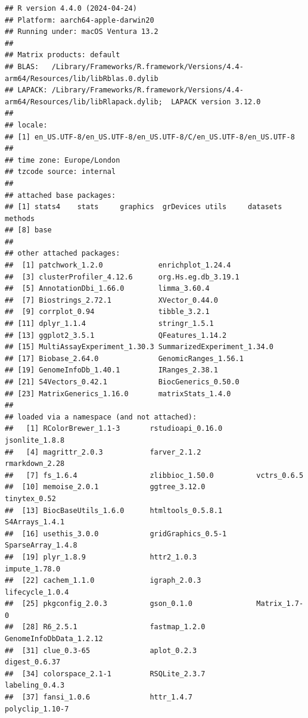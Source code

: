\documentclass[9pt,a4paper,]{extarticle}
\begin{document}
\begin{verbatim}
## R version 4.4.0 (2024-04-24)
## Platform: aarch64-apple-darwin20
## Running under: macOS Ventura 13.2
## 
## Matrix products: default
## BLAS:   /Library/Frameworks/R.framework/Versions/4.4-arm64/Resources/lib/libRblas.0.dylib 
## LAPACK: /Library/Frameworks/R.framework/Versions/4.4-arm64/Resources/lib/libRlapack.dylib;  LAPACK version 3.12.0
## 
## locale:
## [1] en_US.UTF-8/en_US.UTF-8/en_US.UTF-8/C/en_US.UTF-8/en_US.UTF-8
## 
## time zone: Europe/London
## tzcode source: internal
## 
## attached base packages:
## [1] stats4    stats     graphics  grDevices utils     datasets  methods  
## [8] base     
## 
## other attached packages:
##  [1] patchwork_1.2.0             enrichplot_1.24.4          
##  [3] clusterProfiler_4.12.6      org.Hs.eg.db_3.19.1        
##  [5] AnnotationDbi_1.66.0        limma_3.60.4               
##  [7] Biostrings_2.72.1           XVector_0.44.0             
##  [9] corrplot_0.94               tibble_3.2.1               
## [11] dplyr_1.1.4                 stringr_1.5.1              
## [13] ggplot2_3.5.1               QFeatures_1.14.2           
## [15] MultiAssayExperiment_1.30.3 SummarizedExperiment_1.34.0
## [17] Biobase_2.64.0              GenomicRanges_1.56.1       
## [19] GenomeInfoDb_1.40.1         IRanges_2.38.1             
## [21] S4Vectors_0.42.1            BiocGenerics_0.50.0        
## [23] MatrixGenerics_1.16.0       matrixStats_1.4.0          
## 
## loaded via a namespace (and not attached):
##   [1] RColorBrewer_1.1-3       rstudioapi_0.16.0        jsonlite_1.8.8          
##   [4] magrittr_2.0.3           farver_2.1.2             rmarkdown_2.28          
##   [7] fs_1.6.4                 zlibbioc_1.50.0          vctrs_0.6.5             
##  [10] memoise_2.0.1            ggtree_3.12.0            tinytex_0.52            
##  [13] BiocBaseUtils_1.6.0      htmltools_0.5.8.1        S4Arrays_1.4.1          
##  [16] usethis_3.0.0            gridGraphics_0.5-1       SparseArray_1.4.8       
##  [19] plyr_1.8.9               httr2_1.0.3              impute_1.78.0           
##  [22] cachem_1.1.0             igraph_2.0.3             lifecycle_1.0.4         
##  [25] pkgconfig_2.0.3          gson_0.1.0               Matrix_1.7-0            
##  [28] R6_2.5.1                 fastmap_1.2.0            GenomeInfoDbData_1.2.12 
##  [31] clue_0.3-65              aplot_0.2.3              digest_0.6.37           
##  [34] colorspace_2.1-1         RSQLite_2.3.7            labeling_0.4.3          
##  [37] fansi_1.0.6              httr_1.4.7               polyclip_1.10-7         

\end{verbatim}
\end{document}
